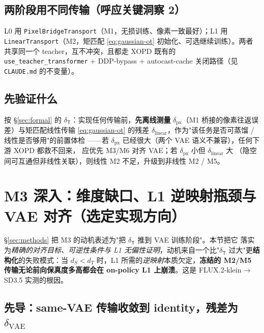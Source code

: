 \documentclass[11pt,a4paper]{article}
\newcommand{\Tmap}{\mathsf{T}}
\theoremstyle{definition}
\begin{document}
\subsection{两阶段用不同传输（呼应关键洞察 2）}
L0 用 \texttt{PixelBridgeTransport}（M1，无损训练、像素一致最好）；L1 用
\texttt{LinearTransport}（M2，矩匹配 \eqref{eq:gaussian-ot} 初始化、可选继续训练）。两者
共享同一个 teacher，互不冲突，且都走 XOPD 既有的 \texttt{use\_teacher\_transformer} +
DDP-bypass + autocast-cache 关闭路径（见 \texttt{CLAUDE.md} 的不变量）。

\subsection{先验证什么}
按 \S\ref{sec:formal} 的 $\delta_{\Tmap}$：实现任何传输前，\textbf{先离线测量}
$\delta_{\mathrm{px}}$（M1 桥接的像素往返误差）与矩匹配线性传输 \eqref{eq:gaussian-ot}
的残差 $\delta_{\mathrm{linear}}$，作为"该任务是否可蒸馏 / 线性是否够用"的前置体检
——若 $\delta_{\mathrm{px}}$ 已经很大（两个 VAE 语义不兼容），任何下游 XOPD 都救不回来，
应优先 M3/M6 对齐 VAE；若 $\delta_{\mathrm{px}}$ 小但 $\delta_{\mathrm{linear}}$ 大
（隐空间可互通但非线性关联），则线性 M2 不足，升级到非线性 M2 / M5。

\section{M3 深入：维度缺口、L1 逆映射瓶颈与 VAE 对齐（选定实现方向）}
\label{sec:m3-deep}

§\ref{sec:methods} 把 M3 的动机表述为"把 $\delta_{\Tmap}$ 推到 VAE 训练阶段"。本节把它
落实为\emph{精确的对齐目标、可逆性条件与 L1 无偏性证明}，动机来自一个比"$\delta_{\Tmap}$
过大"更\textbf{结构化}的失败模式：当 $d_S<d_T$ 时，L1 所需的\emph{逆映射}本质欠定，\textbf{冻结的
M2/M5 传输无论前向保真度多高都会在 on-policy L1 上崩溃}。这是 FLUX.2-klein$\to$SD3.5 实测的根因。

\subsection[先导：same-VAE 传输收敛到 identity]
{先导：same-VAE 传输收敛到 identity，残差为 $\delta_{\mathrm{VAE}}$}
\end{document}

